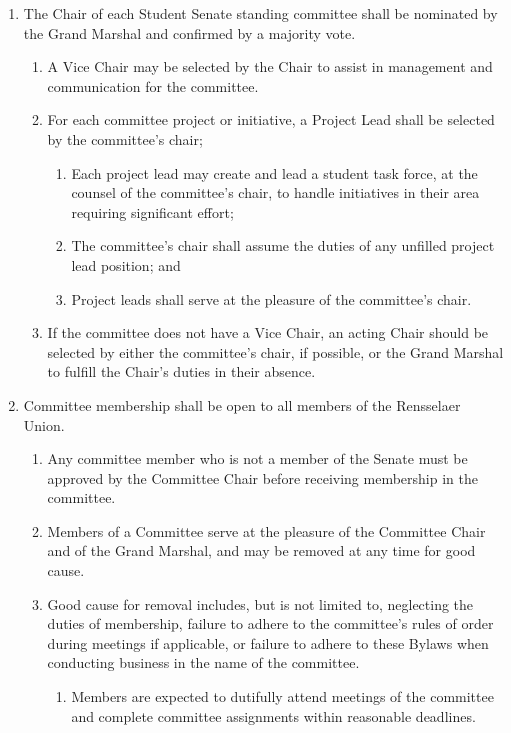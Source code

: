 \documentclass{uniondoc}
\begin{document}
\begin{enumerate}
	\item The Chair of each Student Senate standing committee shall be nominated by the Grand Marshal and confirmed by a majority vote.
	      \begin{enumerate}
		      \item A Vice Chair may be selected by the Chair to assist in management and communication for the committee.
		      \item For each committee project or initiative, a Project Lead shall be selected by the committee’s chair;
		            \begin{enumerate}
			            \item Each project lead may create and lead a student task force, at the counsel of the committee’s chair, to handle initiatives in their area requiring significant effort;
			            \item The committee’s chair shall assume the duties of any unfilled project lead position; and
			            \item Project leads shall serve at the pleasure of the committee’s chair.
		            \end{enumerate}
		      \item If the committee does not have a Vice Chair, an acting Chair should be selected by either the committee’s chair, if possible, or the Grand Marshal to fulfill the Chair’s duties in their absence.
	      \end{enumerate}
	\item Committee membership shall be open to all members of the Rensselaer Union.
	      \begin{enumerate}
		      \item Any committee member who is not a member of the Senate must be approved by the Committee Chair before receiving membership in the committee.
		      \item Members of a Committee serve at the pleasure of the Committee Chair and of the Grand Marshal,
		            and may be removed at any time for good cause.
		      \item Good cause for removal includes, but is not limited to, neglecting the duties of membership, failure to adhere to the committee’s rules of order during meetings if applicable, or failure to adhere to these Bylaws when conducting business in the name of the committee.
		            \begin{enumerate}
			            \item Members are expected to dutifully attend meetings of the committee and complete committee assignments within reasonable deadlines.

\end{enumerate}
\end{enumerate}
\end{enumerate}
\end{document}
